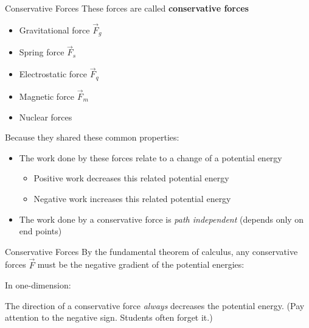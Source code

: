 \documentclass[12pt,compress,aspectratio=169]{beamer}
\begin{document}
\begin{frame}{Conservative Forces}
  These forces are called \textbf{conservative forces}
  \begin{itemize}
  \item Gravitational force $\vec F_g$
  \item Spring force $\vec F_s$
  \item Electrostatic force $\vec F_q$
  \item Magnetic force $\vec F_m$
  \item Nuclear forces
  \end{itemize}
  Because they shared these common properties:
  \begin{itemize}
  \item The work done by these forces relate to a change of a potential energy
    \begin{itemize}
    \item Positive work decreases this related potential energy
    \item Negative work increases this related potential energy
    \end{itemize}
  \item The work done by a conservative force is \emph{path independent}
    (depends only on end points)
  \end{itemize}
\end{frame}



\begin{frame}{Conservative Forces}
  By the fundamental theorem of calculus, any conservative forces $\vec F$
  must be the negative gradient of the potential energies:


  In one-dimension:


  The direction of a conservative force \emph{always} decreases the potential
  energy. (Pay attention to the negative sign. Students often forget it.)
\end{frame}
\end{document}
